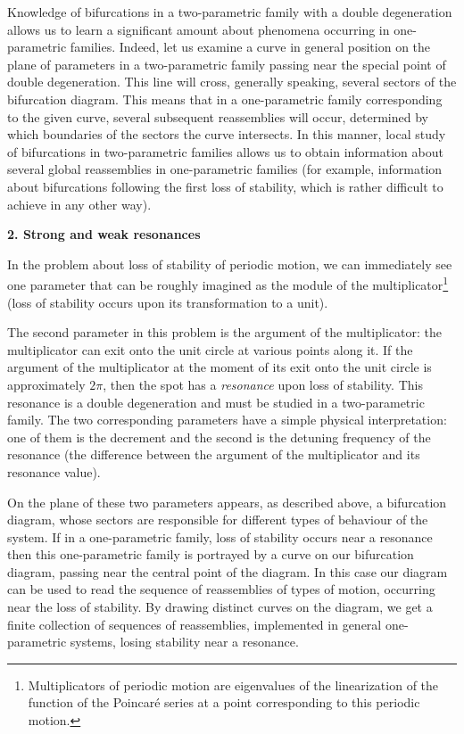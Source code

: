 \documentclass[12pt]{amsart}
\begin{document}
Knowledge of bifurcations in a two-parametric family with a double degeneration
allows us to learn a significant amount about phenomena occurring in
one-parametric families.
Indeed, let us examine a curve in general position on the plane of parameters
in a two-parametric family passing near the special point of double
degeneration.
This line will cross, generally speaking, several sectors of the bifurcation
diagram.
This means that in a one-parametric family corresponding to the given curve,
several subsequent reassemblies will occur, determined by which boundaries of
the sectors the curve intersects.
In this manner, local study of bifurcations in two-parametric families allows us
to obtain information about several global reassemblies in one-parametric
families (for example, information about bifurcations following the first loss
of stability, which is rather difficult to achieve in any other way).\\

\centerline{\textbf{2. Strong and weak resonances}}
\vspace{1em}
In the problem about loss of stability of periodic motion, we can immediately
see one parameter that can be roughly imagined as the module of the
multiplicator\footnote{Multiplicators of periodic motion are eigenvalues of the
linearization of the function of the Poincar\'e series at a point corresponding to
this periodic motion.} (loss of stability occurs upon its transformation to a
unit).

The second parameter in this problem is the argument of the multiplicator:
the multiplicator can exit onto the unit circle at various points along it.
If the argument of the multiplicator at the moment of its exit onto the unit
circle is approximately $2\pi$, then the spot has a \textit{resonance} upon loss
of stability.
This resonance is a double degeneration and must be studied in a two-parametric
family.
The two corresponding parameters have a simple physical interpretation: one of
them is the decrement and the second is the detuning frequency of the resonance
(the difference between the argument of the multiplicator and its resonance
value).

On the plane of these two parameters appears, as described above, a bifurcation
diagram, whose sectors are responsible for different types of behaviour of the
system.
If in a one-parametric family, loss of stability occurs near a resonance then this
one-parametric family is portrayed by a curve on our bifurcation diagram,
passing near the central point of the diagram.
In this case our diagram can be used to read the sequence of reassemblies of
types of motion, occurring near the loss of stability.
By drawing distinct curves on the diagram, we get a finite collection of
sequences of reassemblies, implemented in general one-parametric systems, losing
stability near a resonance.
\end{document}
